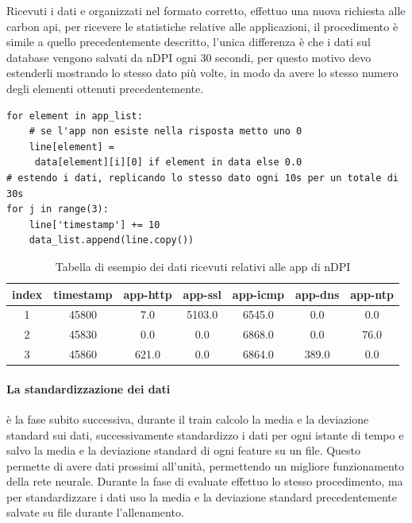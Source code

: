 Ricevuti i dati e organizzati nel formato corretto, effettuo una nuova richiesta alle carbon api, per ricevere le statistiche relative alle applicazioni, il procedimento è simile a quello precedentemente descritto, l'unica differenza è che i dati sul database vengono salvati da nDPI ogni 30 secondi, per questo motivo devo estenderli mostrando lo stesso dato più volte, in modo da avere lo stesso numero degli elementi ottenuti precedentemente.

\begin{lstlisting}[language=python3]
for element in app_list:
    # se l'app non esiste nella risposta metto uno 0
    line[element] =
     data[element][i][0] if element in data else 0.0
# estendo i dati, replicando lo stesso dato ogni 10s per un totale di 30s
for j in range(3):
    line['timestamp'] += 10
    data_list.append(line.copy())
\end{lstlisting}

\begin{table}[]

    \begin{tabular}{||c c c c c c c||} 
    \hline
    index & timestamp  & app-http & app-ssl & app-icmp & app-dns & app-ntp \\ [0.5ex] 
    \hline\hline
    1 & 45800 & 7.0 & 5103.0 & 6545.0 & 0.0 &  0.0\\ 
    \hline
    2 & 45830 & 0.0 & 0.0 & 6868.0& 0.0 &  76.0 \\
    \hline
    3 & 45860 & 621.0 & 0.0 & 6864.0 & 389.0  &  0.0 \\
    \hline
    \end{tabular}
    \caption{Tabella di esempio dei dati ricevuti relativi alle app di nDPI}
    \label{table:tabella_dati_2}
\end{table}


\paragraph{La standardizzazione dei dati} è la fase subito successiva,
durante il train calcolo la media e la deviazione standard sui dati, successivamente standardizzo  i dati per ogni istante di tempo e salvo la media e la deviazione standard di ogni feature su un file. Questo permette di avere dati prossimi all'unità, permettendo un migliore funzionamento della rete neurale. Durante la fase di evaluate effettuo lo stesso procedimento, ma per standardizzare i dati uso la media e la deviazione standard precedentemente salvate su file durante l'allenamento.


